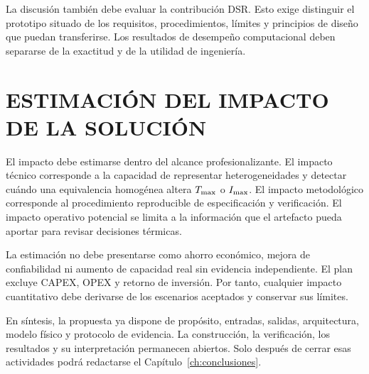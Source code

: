 La discusión también debe evaluar la contribución DSR. Esto exige distinguir el prototipo situado de los requisitos, procedimientos, límites y principios de diseño que puedan transferirse. Los resultados de desempeño computacional deben separarse de la exactitud y de la utilidad de ingeniería.


\section{ESTIMACIÓN DEL IMPACTO DE LA SOLUCIÓN}
\label{sec:impacto}

El impacto debe estimarse dentro del alcance profesionalizante. El impacto técnico corresponde a la capacidad de representar heterogeneidades y detectar cuándo una equivalencia homogénea altera $T_{\max}$ o $I_{\max}$. El impacto metodológico corresponde al procedimiento reproducible de especificación y verificación. El impacto operativo potencial se limita a la información que el artefacto pueda aportar para revisar decisiones térmicas.

La estimación no debe presentarse como ahorro económico, mejora de confiabilidad ni aumento de capacidad real sin evidencia independiente. El plan excluye CAPEX, OPEX y retorno de inversión. Por tanto, cualquier impacto cuantitativo debe derivarse de los escenarios aceptados y conservar sus límites.


En síntesis, la propuesta ya dispone de propósito, entradas, salidas, arquitectura, modelo físico y protocolo de evidencia. La construcción, la verificación, los resultados y su interpretación permanecen abiertos. Solo después de cerrar esas actividades podrá redactarse el Capítulo~\ref{ch:conclusiones}.

